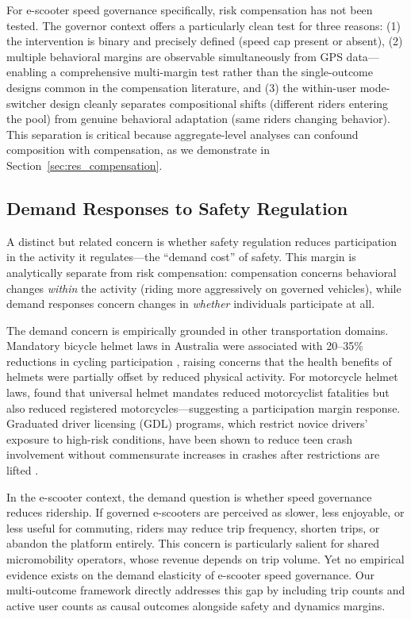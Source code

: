 For e-scooter speed governance specifically, risk compensation has not been tested. The governor context offers a particularly clean test for three reasons: (1) the intervention is binary and precisely defined (speed cap present or absent), (2) multiple behavioral margins are observable simultaneously from GPS data---enabling a comprehensive multi-margin test rather than the single-outcome designs common in the compensation literature, and (3) the within-user mode-switcher design cleanly separates compositional shifts (different riders entering the pool) from genuine behavioral adaptation (same riders changing behavior). This separation is critical because aggregate-level analyses can confound composition with compensation, as we demonstrate in Section~\ref{sec:res_compensation}.

\subsection{Demand Responses to Safety Regulation}
\label{sec:bg_demand}

A distinct but related concern is whether safety regulation reduces participation in the activity it regulates---the ``demand cost'' of safety. This margin is analytically separate from risk compensation: compensation concerns behavioral changes \textit{within} the activity (riding more aggressively on governed vehicles), while demand responses concern changes in \textit{whether} individuals participate at all.

The demand concern is empirically grounded in other transportation domains. Mandatory bicycle helmet laws in Australia were associated with 20--35\% reductions in cycling participation \citep{robinson1996head}, raising concerns that the health benefits of helmets were partially offset by reduced physical activity. For motorcycle helmet laws, \citet{dee2009motorcycle} found that universal helmet mandates reduced motorcyclist fatalities but also reduced registered motorcycles---suggesting a participation margin response. Graduated driver licensing (GDL) programs, which restrict novice drivers' exposure to high-risk conditions, have been shown to reduce teen crash involvement without commensurate increases in crashes after restrictions are lifted \citep{shope2007graduated}.

In the e-scooter context, the demand question is whether speed governance reduces ridership. If governed e-scooters are perceived as slower, less enjoyable, or less useful for commuting, riders may reduce trip frequency, shorten trips, or abandon the platform entirely. This concern is particularly salient for shared micromobility operators, whose revenue depends on trip volume. Yet no empirical evidence exists on the demand elasticity of e-scooter speed governance. Our multi-outcome framework directly addresses this gap by including trip counts and active user counts as causal outcomes alongside safety and dynamics margins.

